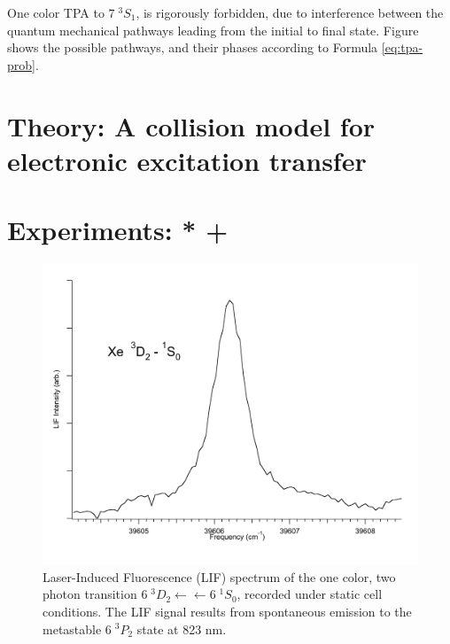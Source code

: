 \documentclass[12pt]{mitthesis}
\begin{document}


One color TPA to $7 \; ^3S_1$, is rigorously forbidden, due to
interference between the quantum mechanical pathways leading from the
initial to final state.  Figure  shows the
possible pathways, and their phases according to Formula
\ref{eq:tpa-prob}.




\section{Theory: A collision model for electronic excitation transfer}

\section{Experiments: * + }

\begin{figure}
  \caption{Laser-Induced Fluorescence (LIF) spectrum of the one color,
    two photon transition  $6\;^3D_2 \leftarrow \leftarrow
    6\;^1S_0$, recorded under static cell conditions.  The LIF signal
    results from spontaneous emission to the metastable $6\;^3P_2$
    state at 823 nm.}
  \label{fig:xe3d2-cell}
  \centering
  \includegraphics[width=6in]{Xe3D2-cell.pdf}
\end{figure}
\end{document}
